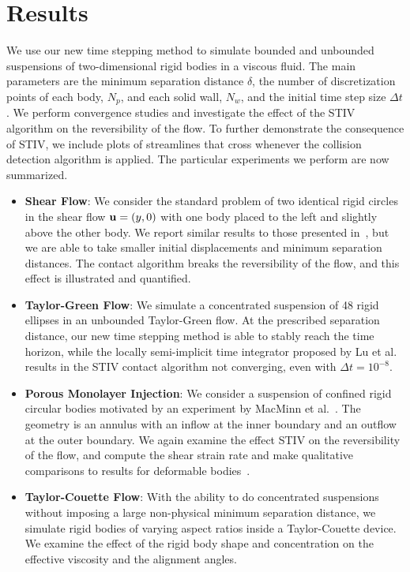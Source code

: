 \documentclass[AMA,STIX1COL]{WileyNJD-v2}
\begin{document}
\section{Results}\label{s:results}
We use our new time stepping method to simulate bounded and unbounded
suspensions of two-dimensional rigid bodies in a viscous fluid.  The
main parameters are the minimum separation distance $\delta$, the number
of discretization points of each body, $N_p$, and each solid wall,
$N_w$, and the initial time step size $\Delta t$. We perform convergence
studies and investigate the effect of the STIV algorithm on the
reversibility of the flow.  To further demonstrate the consequence of
STIV, we include plots of streamlines that cross whenever the collision
detection algorithm is applied.  The particular experiments we perform
are now summarized.
\begin{itemize}
  \item {\bf Shear Flow}: We consider the standard problem of two
  identical rigid circles in the shear flow ${\mathbf{u}} = (y,0)$ with one body
  placed to the left and slightly above the other body.  We report
  similar results to those presented in~\cite{Lu2017}, but we are able
  to take smaller initial displacements and minimum separation
  distances.  The contact algorithm breaks the reversibility of the
  flow, and this effect is illustrated and quantified.

  \item {\bf Taylor-Green Flow}: We simulate a concentrated suspension
  of 48 rigid ellipses in an unbounded Taylor-Green flow. At the
  prescribed separation distance, our new time stepping method is able
  to stably reach the time horizon, while the locally semi-implicit time
  integrator proposed by Lu et al.~\cite{Lu2017} results in the STIV
  contact algorithm not converging, even with $\Delta t = 10^{-8}$.

  \item {\bf Porous Monolayer Injection}: We consider a suspension of
  confined rigid circular bodies motivated by an experiment by MacMinn
  et al.~\cite{MacMinn2015}.  The geometry is an annulus with an inflow
  at the inner boundary and an outflow at the outer boundary.  We again
  examine the effect STIV on the reversibility of the flow, and compute
  the shear strain rate and make qualitative comparisons to results for
  deformable bodies~\cite{MacMinn2015}.

  \item {\bf Taylor-Couette Flow}: With the ability to do concentrated
  suspensions without imposing a large non-physical minimum separation
  distance, we simulate rigid bodies of varying aspect ratios inside a
  Taylor-Couette device.  We examine the effect of the rigid body shape
  and concentration on the effective viscosity and the alignment angles.
\end{itemize}
\end{document}
